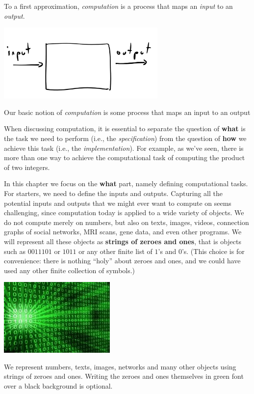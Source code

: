 To a first approximation, \emph{computation} is a process that maps an
\emph{input} to an \emph{output}.


\begin{marginfigure}
\centering
\includegraphics[width=\linewidth, height=1.5in, keepaspectratio]{../figure/input_output.png}
\caption{Our basic notion of \emph{computation} is some process that
maps an input to an output}
\label{computationinputtooutputfig}
\end{marginfigure}

When discussing computation, it is essential to separate the question of
\textbf{what} is the task we need to perform (i.e., the
\emph{specification}) from the question of \textbf{how} we achieve this
task (i.e., the \emph{implementation}). For example, as we've seen,
there is more than one way to achieve the computational task of
computing the product of two integers.

In this chapter we focus on the \textbf{what} part, namely defining
computational tasks. For starters, we need to define the inputs and
outputs. Capturing all the potential inputs and outputs that we might
ever want to compute on seems challenging, since computation today is
applied to a wide variety of objects. We do not compute merely on
numbers, but also on texts, images, videos, connection graphs of social
networks, MRI scans, gene data, and even other programs. We will
represent all these objects as \textbf{strings of zeroes and ones}, that
is objects such as \(0011101\) or \(1011\) or any other finite list of
\(1\)'s and \(0\)'s. (This choice is for convenience: there is nothing
``holy'' about zeroes and ones, and we could have used any other finite
collection of symbols.)


\begin{marginfigure}
\centering
\includegraphics[width=\linewidth, height=1.5in, keepaspectratio]{../figure/zeroes-ones.jpg}
\caption{We represent numbers, texts, images, networks and many other
objects using strings of zeroes and ones. Writing the zeroes and ones
themselves in green font over a black background is optional.}
\label{zerosandonesgreenfig}
\end{marginfigure}


